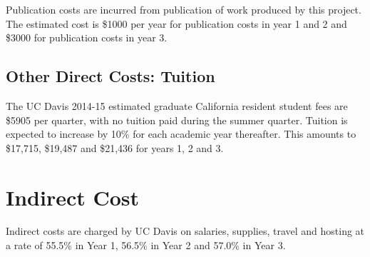 \documentclass[11pt]{article}
\begin{document}
Publication costs are incurred from publication of work produced by this project.  The estimated cost is \$1000 per year for publication costs in year 1 and 2 and \$3000 for publication costs in year 3.

\subsection{Other Direct Costs: Tuition}

The UC Davis 2014-15 estimated graduate California resident student fees are \$5905 per quarter, with no tuition paid during the summer quarter.  Tuition is expected to increase by 10\% for each academic year thereafter.  This amounts to \$17,715, \$19,487 and \$21,436 for years 1, 2 and 3.

\section{Indirect Cost}
\vspace{-0.3cm}

Indirect costs are charged by UC Davis on salaries, supplies, travel and hosting at a rate of 55.5\% in Year 1, 56.5\% in Year 2 and 57.0\% in Year 3.
\end{document}
